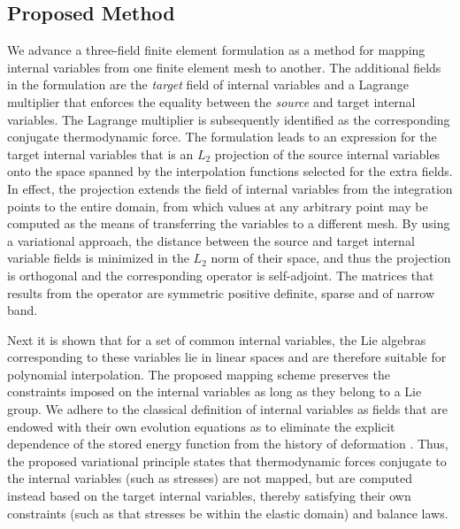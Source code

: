 \documentclass[12pt]{article}
\begin{document}
\subsection{Proposed Method}

We advance a three-field finite element formulation as a method for mapping
internal variables from one finite element mesh to another. The additional
fields in the formulation are the \emph{target} field of internal variables and
a Lagrange multiplier that enforces the equality between the \emph{source} and
target internal variables. The Lagrange multiplier is subsequently identified as
the corresponding conjugate thermodynamic force. The formulation leads to an
expression for the target internal variables that is an $L_2$ projection of the
source internal variables onto the space spanned by the interpolation functions
selected for the extra fields. In effect, the projection extends the field of
internal variables from the integration points to the entire domain, from which
values at any arbitrary point may be computed as the means of transferring the
variables to a different mesh. By using a variational approach, the distance
between the source and target internal variable fields is minimized in the $L_2$
norm of their space, and thus the projection is orthogonal and the corresponding
operator is self-adjoint. The matrices that results from the operator are
symmetric positive definite, sparse and of narrow band.

Next it is shown that for a set of common internal variables, the Lie algebras
corresponding to these variables lie in linear spaces and are therefore suitable
for polynomial interpolation.  The proposed mapping scheme preserves the
constraints imposed on the internal variables as long as they belong to a Lie
group. We adhere to the classical definition of internal variables as fields
that are endowed with their own evolution equations as to eliminate the explicit
dependence of the stored energy function from the history of deformation
\citep{Muschik:2001, Antman:2005}. Thus, the proposed variational principle
states that thermodynamic forces conjugate to the internal variables (such as
stresses) are not mapped, but are computed instead based on the target internal
variables, thereby satisfying their own constraints (such as that stresses be
within the elastic domain) and balance laws.
\end{document}
